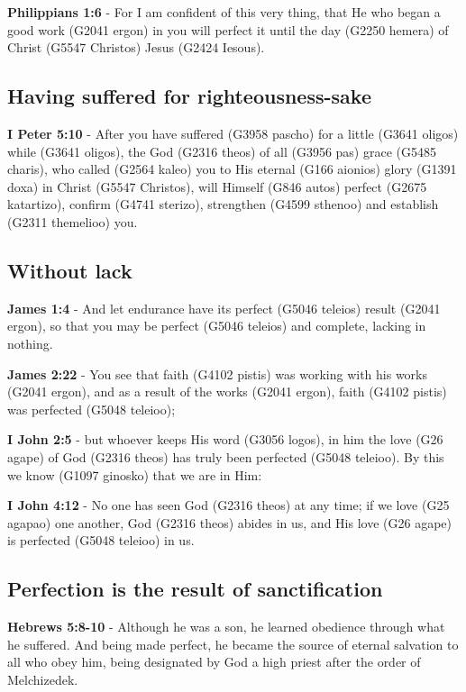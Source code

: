 \documentclass[11pt]{article}
\begin{document}
\textbf{Philippians 1:6} - For I am confident of this very thing, that He who began a good work (G2041 ergon) in you will perfect it until the day (G2250 hemera) of Christ (G5547 Christos) Jesus (G2424 Iesous).

\subsection{Having suffered for righteousness-sake}
\label{sec:org63f9ec6}
\textbf{I Peter 5:10} - After you have suffered (G3958 pascho) for a little (G3641 oligos) while (G3641 oligos), the God (G2316 theos) of all (G3956 pas) grace (G5485 charis), who called (G2564 kaleo) you to His eternal (G166 aionios) glory (G1391 doxa) in Christ (G5547 Christos), will Himself (G846 autos) perfect (G2675 katartizo), confirm (G4741 sterizo), strengthen (G4599 sthenoo) and establish (G2311 themelioo) you.

\subsection{Without lack}
\label{sec:org974f70f}
\textbf{James 1:4} - And let endurance have its perfect (G5046 teleios) result (G2041 ergon), so that you may be perfect (G5046 teleios) and complete, lacking in nothing.

\textbf{James 2:22} - You see that faith (G4102 pistis) was working with his works (G2041 ergon), and as a result of the works (G2041 ergon), faith (G4102 pistis) was perfected (G5048 teleioo);

\textbf{I John 2:5} - but whoever keeps His word (G3056 logos), in him the love (G26 agape) of God (G2316 theos) has truly been perfected (G5048 teleioo). By this we know (G1097 ginosko) that we are in Him:

\textbf{I John 4:12} - No one has seen God (G2316 theos) at any time; if we love (G25 agapao) one another, God (G2316 theos) abides in us, and His love (G26 agape) is perfected (G5048 teleioo) in us.

\subsection{Perfection is the result of sanctification}
\label{sec:org8ee5433}

\textbf{Hebrews 5:8-10} - Although he was a son, he learned obedience through what he suffered. And being made perfect, he became the source of eternal salvation to all who obey him, being designated by God a high priest after the order of Melchizedek.
\end{document}
